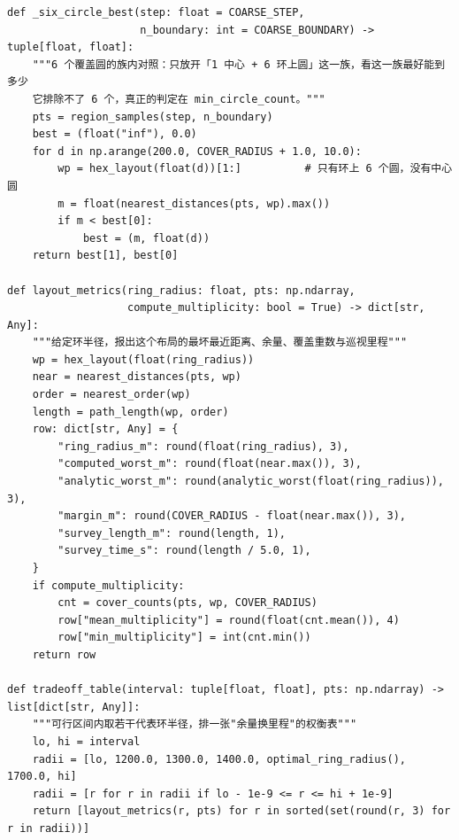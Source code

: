 \documentclass[UTF8, zihao=5,AutoFakeBold=2]{ctexart}
\begin{document}
\begin{lstlisting}
def _six_circle_best(step: float = COARSE_STEP,
                     n_boundary: int = COARSE_BOUNDARY) -> tuple[float, float]:
    """6 个覆盖圆的族内对照：只放开「1 中心 + 6 环上圆」这一族，看这一族最好能到多少
    它排除不了 6 个，真正的判定在 min_circle_count。"""
    pts = region_samples(step, n_boundary)
    best = (float("inf"), 0.0)
    for d in np.arange(200.0, COVER_RADIUS + 1.0, 10.0):
        wp = hex_layout(float(d))[1:]          # 只有环上 6 个圆，没有中心圆
        m = float(nearest_distances(pts, wp).max())
        if m < best[0]:
            best = (m, float(d))
    return best[1], best[0]

def layout_metrics(ring_radius: float, pts: np.ndarray,
                   compute_multiplicity: bool = True) -> dict[str, Any]:
    """给定环半径，报出这个布局的最坏最近距离、余量、覆盖重数与巡视里程"""
    wp = hex_layout(float(ring_radius))
    near = nearest_distances(pts, wp)
    order = nearest_order(wp)
    length = path_length(wp, order)
    row: dict[str, Any] = {
        "ring_radius_m": round(float(ring_radius), 3),
        "computed_worst_m": round(float(near.max()), 3),
        "analytic_worst_m": round(analytic_worst(float(ring_radius)), 3),
        "margin_m": round(COVER_RADIUS - float(near.max()), 3),
        "survey_length_m": round(length, 1),
        "survey_time_s": round(length / 5.0, 1),
    }
    if compute_multiplicity:
        cnt = cover_counts(pts, wp, COVER_RADIUS)
        row["mean_multiplicity"] = round(float(cnt.mean()), 4)
        row["min_multiplicity"] = int(cnt.min())
    return row

def tradeoff_table(interval: tuple[float, float], pts: np.ndarray) -> list[dict[str, Any]]:
    """可行区间内取若干代表环半径，排一张"余量换里程"的权衡表"""
    lo, hi = interval
    radii = [lo, 1200.0, 1300.0, 1400.0, optimal_ring_radius(), 1700.0, hi]
    radii = [r for r in radii if lo - 1e-9 <= r <= hi + 1e-9]
    return [layout_metrics(r, pts) for r in sorted(set(round(r, 3) for r in radii))]


\end{lstlisting}
\end{document}
